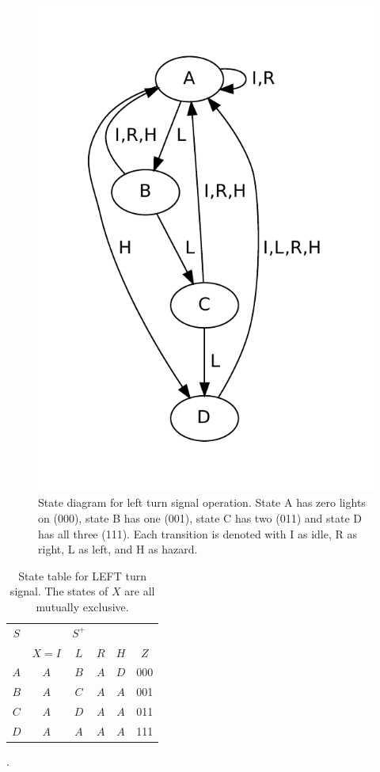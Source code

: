 \documentclass[12pt]{article}
\begin{document}
\begin{figure}[htbp!]
\begin{center}
\includegraphics[scale=0.7]{figures/left-signal}
\end{center}
\caption{State diagram for left turn signal operation.
State A has zero lights on (000), state B has one (001),
state C has two (011) and state D has all three (111).
Each transition is denoted with I as idle, R as right, L as left,
and H as hazard.}
\label{fig:leftstate}
\end{figure}

\begin{table}[htbp!]
\center
\begin{tabular}[t]{c|cccc|c}
$S$ &       & $S^+$ &     &     & \\
    & $X=I$ & $L$   & $R$ & $H$ & $Z$ \\
\hline
$A$ & $A$   & $B$   & $A$ & $D$ & 000 \\
$B$ & $A$   & $C$   & $A$ & $A$ & 001 \\
$C$ & $A$   & $D$   & $A$ & $A$ & 011 \\
$D$ & $A$   & $A$   & $A$ & $A$ & 111 \\
\end{tabular}
\caption{State table for LEFT turn signal.
The states of $X$ are all mutually exclusive.}
\label{tbl:leftstate}.
\end{table}
\end{document}
